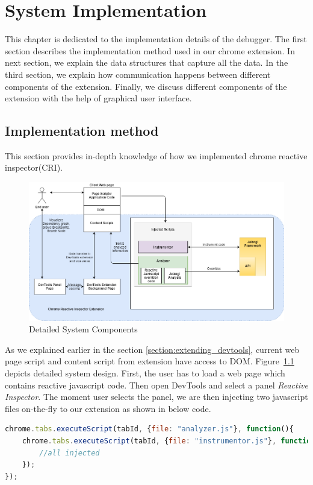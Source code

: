 \chapter{System Implementation} \label{chap:Implementation}
This chapter is dedicated to the implementation details of the debugger. The first section describes the implementation method used in our chrome extension. In next section, we explain the data structures that capture all the data. In the third section, we explain how communication happens between different components of the extension. Finally, we discuss different components of the extension with the help of graphical user interface.

\section{Implementation method}
This section provides in-depth knowledge of how we implemented chrome reactive inspector(CRI).

 
\begin{figure}[!h]
	\centering
	\includegraphics[width=\textwidth,height=\textheight,keepaspectratio]{images/detailed-system-implementation.png}
	\caption{Detailed System Components}
	\label{fig:detailed-system-implementation}
\end{figure}
As we explained earlier in the section \ref{section:extending_devtools}, current web page script and content script from extension have access to DOM. Figure~\ref{fig:detailed-system-implementation} depicts detailed system design. First, the user has to load a web page which contains reactive javascript code. Then open DevTools and select a panel \textit{Reactive Inspector}. The moment user selects the panel, we are then injecting two javascript files on-the-fly to our extension as shown in below code.


\begin{lstlisting}[language=JavaScript, caption=Injecting Javascript Files, label={lst:inject-javascript-files}]
chrome.tabs.executeScript(tabId, {file: "analyzer.js"}, function(){
	chrome.tabs.executeScript(tabId, {file: "instrumentor.js"}, function(){
		//all injected
	});
});
\end{lstlisting}

